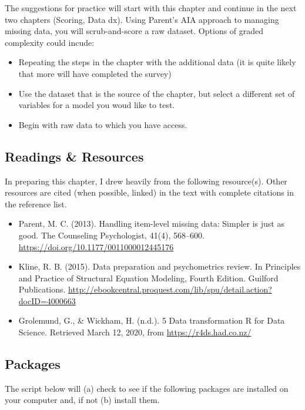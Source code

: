 \documentclass[
  english,
]{book}
\providecommand{\tightlist}{%
  \setlength{\itemsep}{0pt}\setlength{\parskip}{0pt}}
\begin{document}
The suggestions for practice will start with this chapter and continue in the next two chapters (Scoring, Data dx). Using Parent's \citeyearpar{parent_handling_2013} AIA approach to managing missing data, you will scrub-and-score a raw dataset. Options of graded complexity could incude:

\begin{itemize}
\tightlist
\item
  Repeating the steps in the chapter with the additional data (it is quite likely that more will have completed the survey)
\item
  Use the dataset that is the source of the chapter, but select a different set of variables for a model you woud like to test.
\item
  Begin with raw data to which you have access.
\end{itemize}

\hypertarget{readings-resources}{%
\subsection{Readings \& Resources}\label{readings-resources}}

In preparing this chapter, I drew heavily from the following resource(s). Other resources are cited (when possible, linked) in the text with complete citations in the reference list.

\begin{itemize}
\item
  Parent, M. C. (2013). Handling item-level missing data: Simpler is just as good. The Counseling Psychologist, 41(4), 568--600. \url{https://doi.org/10.1177/0011000012445176}
\item
  Kline, R. B. (2015). Data preparation and psychometrics review. In Principles and Practice of Structural Equation Modeling, Fourth Edition. Guilford Publications. \url{http://ebookcentral.proquest.com/lib/spu/detail.action?docID=4000663}
\item
  Grolemund, G., \& Wickham, H. (n.d.). 5 Data transformation \textbar{} R for Data Science. Retrieved March 12, 2020, from \url{https://r4ds.had.co.nz/}
\end{itemize}

\hypertarget{packages}{%
\subsection{Packages}\label{packages}}

The script below will (a) check to see if the following packages are installed on your computer and, if not (b) install them.
\end{document}

